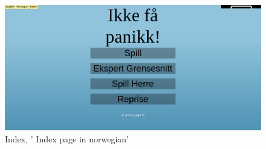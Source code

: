 \begin{figure}[H]
  \centering
    \includegraphics[width=1.0\textwidth]{img/indexno.png}
  \caption{Index, ' Index page in norwegian'} 
  \label{fig:indexno}
\end{figure}


